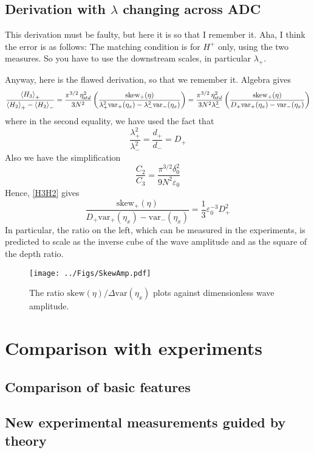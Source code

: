 \documentclass[11pt]{article}
\newcommand{\vsp}[1]{\vspace{#1 pc} \noindent}
\newcommand{\mean}[1]{\left< #1 \right>}
\newcommand{\eps}{\varepsilon}
\newcommand{\etastd}{\eta_{\text std}}
\newcommand{\depth}{d}
\newcommand{\dup}{\depth_{-}}
\newcommand{\ddn}{\depth_{+}}
\newcommand{\lam}{\lambda}
\newcommand{\lamup}{\lam_{-}}
\newcommand{\lamdn}{\lam_{+}}
\newcommand{\lamfac}{N}
\newcommand{\drat}{D}
\newcommand{\dratdn}{\drat_+}
\newcommand{\skw}{\text{skew}}
\newcommand{\skwdn}{\skw_+}
\newcommand{\var}{\text{var}}
\newcommand{\varup}{\var_-}
\newcommand{\vardn}{\var_+}
\newcommand{\epsup}{\eps_0}
\newcommand{\delup}{\delta_0}
\newcommand{\Ham}{H}
\newcommand{\Hdn}{\Ham^{+}}
\newcommand{\meanup}[1]{\mean{#1}_{-}}
\newcommand{\meandn}[1]{\mean{#1}_{+}}
\begin{document}
\subsection{Derivation with $\lam$ changing across ADC}
This derivation must be faulty, but here it is so that I remember it.
Aha, I think the error is as follows: The matching condition is for $\Hdn$ only, using the two measures. So you have to use the downstream scales, in particular $\lamdn$. 

\vsp{1}
Anyway, here is the flawed derivation, so that we remember it.
Algebra gives
\begin{equation}
\frac{\meandn{H_3}} {\meandn{H_2} - \meanup{H_2}} = 
\frac{\pi^{3/2} \, \etastd^2} {3 \lamfac^2} 
\left( \frac{\skwdn(\eta)}{ \lamdn^2 \vardn(\eta_x) - \lamup^2 \varup(\eta_x)} \right) = 
\frac{\pi^{3/2} \, \etastd^2} {3 \lamfac^2 \lamup^2} 
\left( \frac{\skwdn(\eta)} {\dratdn \vardn(\eta_x) - \varup(\eta_x)} \right)
\end{equation}
where in the second equality, we have used the fact that
\begin{equation}
\frac{\lamdn^2}{\lamup^2} = \frac{\ddn}{\dup} = \dratdn
\end{equation}
Also we have the simplification
\begin{equation}
\frac{C_2}{C_3} = \frac{\pi^{3/2} \delup^2}{9 \lamfac^2 \epsup}
\end{equation}
Hence, \eqref{H3H2} gives
\begin{equation}
\frac{\skwdn(\eta)} {\dratdn \vardn(\eta_x) - \varup(\eta_x)} = \frac{1}{3} \epsup^{-3} \dratdn^2
\end{equation}
In particular, the ratio on the left, which can be measured in the experiments, is predicted to scale as the inverse cube of the wave amplitude and as the square of the depth ratio.

\begin{figure}%
\begin{center}
\texttt{[image: ../Figs/SkewAmp.pdf]}
\caption{\label{fig1} 
The ratio ${\skw(\eta)}/{\Delta \var(\eta_x)}$ plots against dimensionless wave amplitude.
}
\end{center}
\end{figure}



\section{Comparison with experiments}

\subsection{Comparison of basic features}

\subsection{New experimental measurements guided by theory}

%
%
\end{document}

